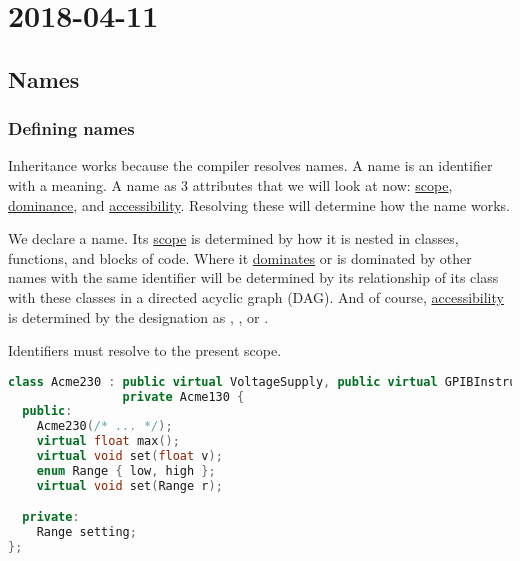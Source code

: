 \section{2018-04-11}

\subsection{Names}

\subsubsection{Defining names}

Inheritance works because the compiler resolves names. A name is an identifier with a meaning. A name as 3 attributes that we will look at now: \underline{scope}, \underline{dominance}, and \underline{accessibility}. Resolving these will determine how the name works.

We declare a name. Its \underline{scope} is determined by how it is nested in classes, functions, and blocks of code. Where it \underline{dominates} or is dominated by other names with the same identifier will be determined by its relationship of its class with these classes in a directed acyclic graph (DAG). And of course, \underline{accessibility} is determined by the designation as , , or .

Identifiers must resolve to the present scope. 

\begin{lstlisting}[language=C++]
class Acme230 : public virtual VoltageSupply, public virtual GPIBInstrument,
                private Acme130 {
  public:
    Acme230(/* ... */);
    virtual float max();
    virtual void set(float v);
    enum Range { low, high };
    virtual void set(Range r);

  private:
    Range setting;
};
\end{lstlisting}

